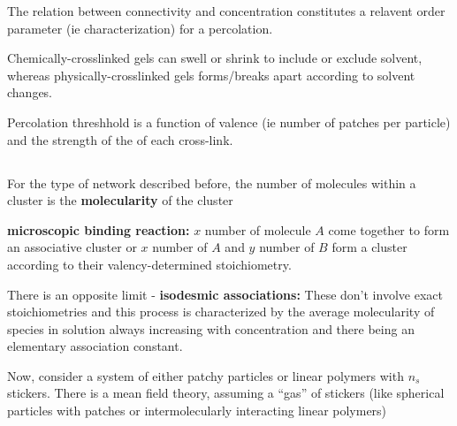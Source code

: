 \documentclass{article}
\begin{document}
The relation between connectivity and concentration constitutes a relavent order parameter (ie characterization) for a percolation.

Chemically-crosslinked gels can swell or shrink to include or exclude solvent, whereas physically-crosslinked gels forms/breaks apart according to solvent changes.

Percolation threshhold is a function of valence (ie number of patches per particle) and the strength of the of each cross-link.

\subsection{}

For the type of network described before, the number of molecules within a cluster is the \textbf{molecularity} of the cluster

\textbf{microscopic binding reaction: } $x$ number of molecule $A$ come together to form an associative cluster or $x$ number of $A$ and $y$ number of $B$ form a cluster according to their valency-determined stoichiometry.

There is an opposite limit - \textbf{isodesmic associations: }These don't involve exact stoichiometries and this process is characterized by the average molecularity of species in solution always increasing with concentration and there being an elementary association constant.

Now, consider a system of either patchy particles or linear polymers with $n_s$ stickers. There is a mean field theory, assuming a ``gas'' of stickers (like spherical particles with patches or intermolecularly interacting linear polymers)
\end{document}
